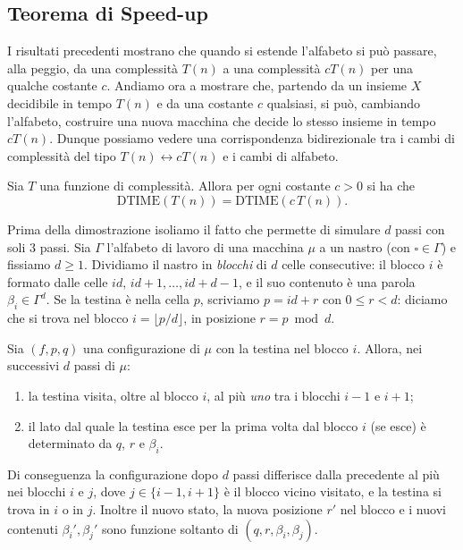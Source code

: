\subsection{Teorema di Speed-up}





I risultati precedenti mostrano che quando si estende l'alfabeto si può passare, alla peggio, da una complessità $T(n)$ a una complessità $cT(n)$ per una qualche costante $c$. Andiamo ora a mostrare che, partendo da un insieme $X$ decidibile in tempo $T(n)$ e da una costante $c$ qualsiasi, si può, cambiando l'alfabeto, costruire una nuova macchina che decide lo stesso insieme in tempo $cT(n)$. Dunque possiamo vedere una corrispondenza bidirezionale tra i cambi di complessità del tipo $T(n)\leftrightarrow cT(n)$ e i cambi di alfabeto.

\begin{theo}[Speed-Up]\label{thm:speedup}
Sia $T$ una funzione di complessità. Allora per ogni costante $c>0$ si ha che
\[
\mathrm{DTIME}(T(n))=\mathrm{DTIME}(c\,T(n)).
\]
\end{theo}

Prima della dimostrazione isoliamo il fatto che permette di simulare $d$ passi con soli $3$ passi. Sia $\Gamma$ l'alfabeto di lavoro di una macchina $\mu$ a un nastro (con $\square\in\Gamma$) e fissiamo $d\geq 1$. Dividiamo il nastro in \emph{blocchi} di $d$ celle consecutive: il blocco $i$ è formato dalle celle $id,\,id+1,\dots,id+d-1$, e il suo contenuto è una parola $\beta_i\in\Gamma^d$. Se la testina è nella cella $p$, scriviamo $p=id+r$ con $0\leq r<d$: diciamo che si trova nel blocco $i=\lfloor p/d\rfloor$, in posizione $r=p\bmod d$.

\begin{lemm}
\label{lem:vicino}
Sia $(f,p,q)$ una configurazione di $\mu$ con la testina nel blocco $i$. Allora, nei successivi $d$ passi di $\mu$:
\begin{enumerate}
    \item la testina visita, oltre al blocco $i$, al più \emph{uno} tra i blocchi $i-1$ e $i+1$;
    \item il lato dal quale la testina esce per la prima volta dal blocco $i$ (se esce) è determinato da $q$, $r$ e $\beta_i$.
\end{enumerate}
Di conseguenza la configurazione dopo $d$ passi differisce dalla precedente al più nei blocchi $i$ e $j$, dove $j\in\{i-1,i+1\}$ è il blocco vicino visitato, e la testina si trova in $i$ o in $j$. Inoltre il nuovo stato, la nuova posizione $r'$ nel blocco e i nuovi contenuti $\beta_i',\beta_j'$ sono funzione soltanto di $(q,r,\beta_i,\beta_j)$.
\end{lemm}

